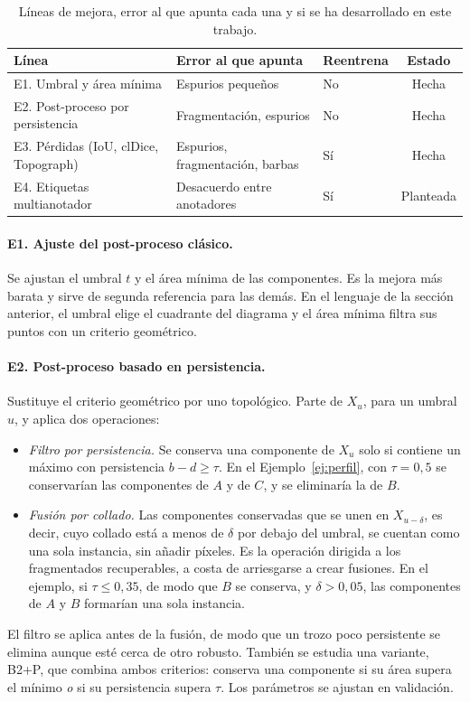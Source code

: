 \begin{table}[ht]
\centering
\footnotesize
\begin{tabular}{@{}lllc@{}}
\toprule
Línea & Error al que apunta & Reentrena & Estado\\
\midrule
E1. Umbral y área mínima & Espurios pequeños & No & Hecha\\
E2. Post-proceso por persistencia & Fragmentación, espurios & No & Hecha\\
E3. Pérdidas (IoU, clDice, Topograph) & Espurios, fragmentación, barbas & Sí & Hecha\\
E4. Etiquetas multianotador & Desacuerdo entre anotadores & Sí & Planteada\\
\bottomrule
\end{tabular}
\caption{Líneas de mejora, error al que apunta cada una y si se ha
desarrollado en este trabajo.}
\label{tab:estrategia}
\end{table}

\paragraph{E1. Ajuste del post-proceso clásico.} Se ajustan el umbral $t$
y el área mínima de las componentes. Es la mejora más barata y sirve de
segunda referencia para las demás. En el lenguaje de la sección
anterior, el umbral elige el cuadrante del diagrama y el área mínima
filtra sus puntos con un criterio geométrico.

\paragraph{E2. Post-proceso basado en persistencia.} Sustituye el
criterio geométrico por uno topológico. Parte de $X_u$, para un umbral
$u$, y aplica dos operaciones:
\begin{itemize}
  \item \emph{Filtro por persistencia.} Se conserva una componente de
  $X_u$ solo si contiene un máximo con persistencia $b-d\ge\tau$. En el
  Ejemplo~\ref{ej:perfil}, con $\tau=0{,}5$ se conservarían las
  componentes de $A$ y de $C$, y se eliminaría la de $B$.
  \item \emph{Fusión por collado.} Las componentes conservadas que se
  unen en $X_{u-\delta}$, es decir, cuyo collado está a menos de $\delta$
  por debajo del umbral, se cuentan como una sola instancia, sin añadir
  píxeles. Es la operación dirigida a los fragmentados recuperables, a
  costa de arriesgarse a crear fusiones. En el ejemplo, si
  $\tau\le0{,}35$, de modo que $B$ se conserva, y $\delta>0{,}05$, las
  componentes de $A$ y $B$ formarían una sola instancia.
\end{itemize}
El filtro se aplica antes de la fusión, de modo que un trozo poco
persistente se elimina aunque esté cerca de otro robusto. También se
estudia una variante, B2+P, que combina ambos criterios: conserva una
componente si su área supera el mínimo \emph{o} si su persistencia
supera $\tau$. Los parámetros se ajustan en validación.

